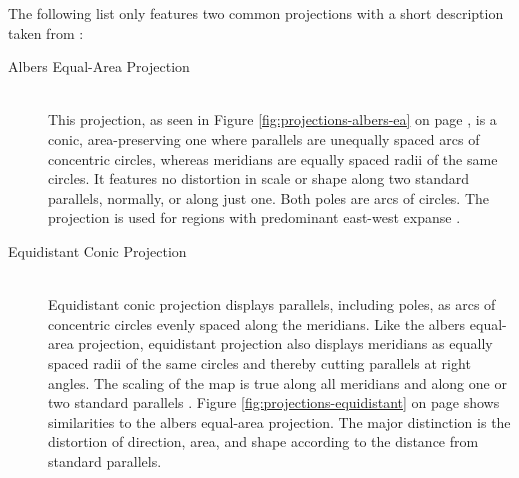 The following list only features two common projections with a short description taken from \citeauthor{Snyder1987} :

\begin{description}
\item[Albers Equal-Area Projection] \hfill \\
\label{s:albers-equal-area-projection}
This projection, as seen in Figure \ref{fig:projections-albers-ea} on page \pageref{fig:projections-albers-ea}, is a conic, area-preserving one where parallels are unequally spaced arcs of concentric circles, whereas meridians are equally spaced radii of the same circles. It features no distortion in scale or shape along two standard parallels, normally, or along just one. Both poles are arcs of circles. The projection is used for regions with predominant east-west expanse .

\item[Equidistant Conic Projection] \hfill \\
Equidistant conic projection displays parallels, including poles, as arcs of concentric circles evenly spaced along the meridians. Like the albers equal-area projection, equidistant projection also displays meridians as equally spaced radii of the same circles and thereby cutting parallels at right angles. The scaling of the map is true along all meridians and along one or two standard parallels . Figure \ref{fig:projections-equidistant} on page \pageref{fig:projections-equidistant} shows similarities to the albers equal-area projection. The major distinction is the distortion of direction, area, and shape according to the distance from standard parallels.
\end{description}


